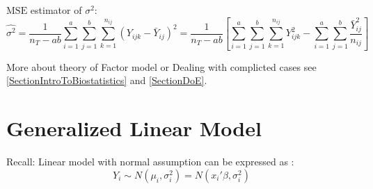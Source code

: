     $ \mathrm{MSE}  $ estimator of $ \sigma ^2 $:
    \begin{equation}
        \hat{\sigma ^2}= \dfrac{1}{n_T-ab}\sum_{i=1}^a\sum_{j=1}^b\sum_{k=1}^{n_{ij}}(Y_{ijk}-\bar{Y}_{ij})^2=\dfrac{1}{n_T-ab}\left[ \sum_{i=1}^a\sum_{j=1}^b\sum_{k=1}^{n_{ij}}Y_{ijk}^2-\sum_{i=1}^a\sum_{j=1}^b\dfrac{\bar{Y}_{ij}^2}{n_{ij}} \right]
    \end{equation}


    More about theory of Factor model or Dealing with complicted cases see \autoref{SectionIntroToBiostatistics} and \autoref{SectionDoE}.
    

    
    

        

    


\section{Generalized Linear Model}\label{SubSectionGeneralizedLinearModel}
    Recall: Linear model with normal assumption can be expressed as :
    \begin{equation}
        Y_i\sim N(\mu _i,\sigma_i ^2)=N(x_i'\beta ,\sigma_i ^2) 
    \end{equation}
    
